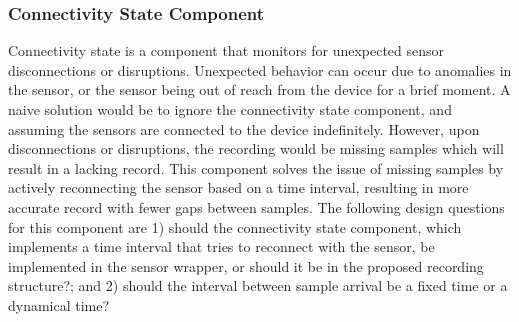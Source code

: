 \subsubsection{Connectivity State Component} \label{sssec:csc}
Connectivity state is a component that monitors for unexpected sensor disconnections or disruptions. Unexpected behavior can occur due to anomalies in the sensor, or the sensor being out of reach from the device for a brief moment.  A naive solution would be to ignore the connectivity state component, and assuming the sensors are connected to the device indefinitely. However, upon disconnections or disruptions, the recording would be missing samples which will result in a lacking record. This component solves the issue of missing samples by actively reconnecting the sensor based on a time interval, resulting in more accurate record with fewer gaps between samples. The following design questions for this component are 1) should the connectivity state component, which implements a time interval that tries to reconnect with the sensor, be implemented in the sensor wrapper, or should it be in the proposed recording structure?; and 2) should the interval between sample arrival be a fixed time or a dynamical time? 


